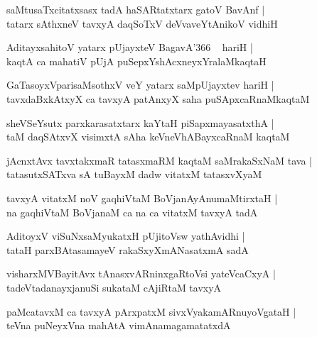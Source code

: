 \documentclass[twoside,12pt,openright]{book}
\newcounter{shloka}[chapter]
\begin{document}
\begin{shloka}%
saMtusaTxcitatxsasx tadA haSARtatxtarx gatoV BavAnf |\\
tatarx sAthxneV tavxyA daqSoTxV deVvaveYtAnikoV vidhiH 
\end{shloka}

\begin{shloka}%
AditayxsahitoV yatarx pUjayxteV BagavA\char'366 ~ hariH |\\
kaqtA ca mahatiV pUjA puSepxYshAcxneyxYralaMkaqtaH 
\end{shloka}

\begin{shloka}%
GaTasoyxVparisaMsothxV veY yatarx saMpUjayxtev hariH |\\
tavxdaBxkAtxyX ca tavxyA patAnxyX saha puSApxcaRnaMkaqtaM 
\end{shloka}

\begin{shloka}%
sheVSeYsutx parxkarasatxtarx kaYtaH piSapxmayasatxthA |\\
taM daqSAtxvX visimxtA sAha keVneVhABayxcaRnaM kaqtaM 
\end{shloka}

\begin{shloka}%
jAcnxtAvx tavxtakxmaR tatasxmaRM kaqtaM saMrakaSxNaM tava |\\
tatasutxSATxva sA tuBayxM dadw vitatxM tatasxvXyaM 
\end{shloka}

\begin{shloka}%
tavxyA vitatxM noV gaqhiVtaM BoVjanAyAnumaMtirxtaH |\\
na gaqhiVtaM BoVjanaM ca na ca vitatxM tavxyA tadA 
\end{shloka}

\begin{shloka}%
AditoyxV viSuNxsaMyukatxH pUjitoVsw yathAvidhi |\\
tataH parxBAtasamayeV rakaSxyXmANasatxmA sadA 
\end{shloka}

\begin{shloka}%
visharxMVBayitAvx tAnasxvARninxgaRtoVsi yateVcaCxyA |\\
tadeVtadanayxjanuSi sukataM cAjiRtaM tavxyA
\end{shloka}

\begin{shloka}%
paMcatavxM ca tavxyA pArxpatxM sivxVyakamARnuyoVgataH |\\
teVna puNeyxVna mahAtA vimAnamagamatatxdA
\end{shloka}
\end{document}
